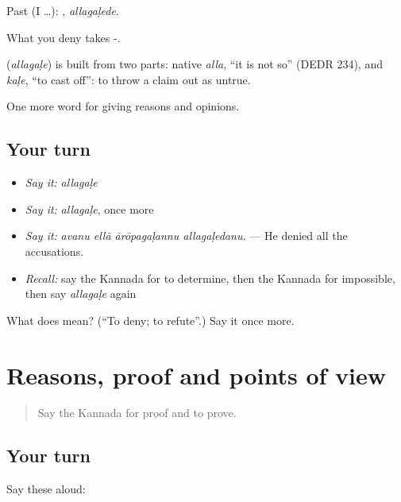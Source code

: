 Past (I …): , \emph{allagaḷede}.

What you deny takes -.

\begin{cousinweb}
\textbf{} (\emph{allagaḷe}) is built from two parts: native \emph{alla}, \textquotedblleft{}it is not so\textquotedblright{} (DEDR 234), and \emph{kaḷe}, \textquotedblleft{}to cast off\textquotedblright{}: to throw a claim out as untrue.
\end{cousinweb}

\begin{grammarlens}[title={What you've built}]
One more word for giving reasons and opinions.
\end{grammarlens}

\subsection*{Your turn}
\begin{itemize}
\raggedright
  \item \emph{Say it:} \emph{allagaḷe}
  \item \emph{Say it:} \emph{allagaḷe}, once more
  \item \emph{Say it:} \emph{avanu ellā ārōpagaḷannu allagaḷedanu.} — He denied all the accusations.
  \item \emph{Recall:} say the Kannada for to determine, then the Kannada for impossible, then say \emph{allagaḷe} again
\end{itemize}

\begin{tcolorbox}[breakable,colback=teal!4,colframe=teal!35!black,title={Before you move on}]
What does  mean? (\textquotedblleft{}To deny; to refute\textquotedblright{}.) Say it once more.
\end{tcolorbox}
\section[(dialogue)]{Reasons, proof and points of view}

\label{lesson:KA-R383-review-376-383}



\begin{quote}
Say the Kannada for proof and to prove.
\end{quote}

\subsection*{Your turn}
Say these aloud:

